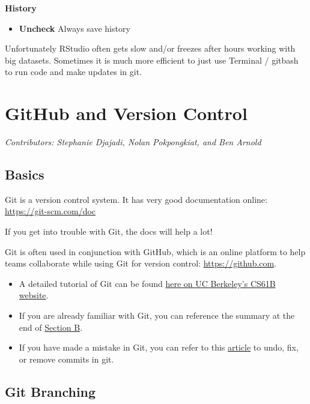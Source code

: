 \documentclass[
]{book}
\providecommand{\tightlist}{%
  \setlength{\itemsep}{0pt}\setlength{\parskip}{0pt}}
\begin{document}
\textbf{History}

\begin{itemize}
\tightlist
\item
  \textbf{Uncheck} Always save history
\end{itemize}

Unfortunately RStudio often gets slow and/or freezes after hours working with big datasets. Sometimes it is much more efficient to just use Terminal / gitbash to run code and make updates in git.

\hypertarget{github}{%
\chapter{GitHub and Version Control}\label{github}}

\emph{Contributors: Stephanie Djajadi, Nolan Pokpongkiat, and Ben Arnold}

\hypertarget{basics-1}{%
\section{Basics}\label{basics-1}}

Git is a version control system. It has very good documentation online: \url{https://git-scm.com/doc}

If you get into trouble with Git, the docs will help a lot!

Git is often used in conjunction with GitHub, which is an online platform to help teams collaborate while using Git for version control: \url{https://github.com}.

\begin{itemize}
\tightlist
\item
  A detailed tutorial of Git can be found \href{https://sp19.datastructur.es/materials/guides/using-git\#b-local-repositories-narrative-introduction}{here on UC Berkeley's CS61B website}.
\item
  If you are already familiar with Git, you can reference the summary at the end of \href{https://sp19.datastructur.es/materials/guides/using-git\#b-local-repositories-narrative-introduction}{Section B}.
\item
  If you have made a mistake in Git, you can refer to this \href{https://sethrobertson.github.io/GitFixUm/fixup.html}{article} to undo, fix, or remove commits in git.
\end{itemize}

\hypertarget{git-branching}{%
\section{Git Branching}\label{git-branching}}
\end{document}
